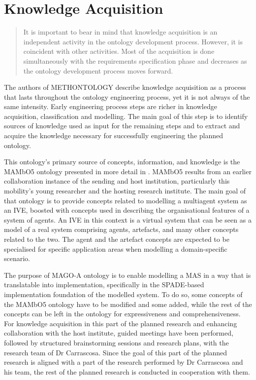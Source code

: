 \chapter{Knowledge Acquisition}\label{ch:Knowledge Acquisition}


\blockquote[{{\cite[p. 37]{fernandez-lopez1997METHONTOLOGYOntologicalArt}}}]{It is important to bear in mind that knowledge acquisition is an independent activity in the ontology development process. However, it is coincident with other activities. \textelp{} Most of the acquisition is done simultaneously with the requirements specification phase and decreases as the ontology development process moves forward.}

The authors of METHONTOLOGY describe knowledge acquisition as a process that lasts throughout the ontology engineering process, yet it is not always of the same intensity. Early engineering process steps are richer in knowledge acquisition, classification and modelling. The main goal of this step is to identify sources of knowledge used as input for the remaining steps and to extract and acquire the knowledge necessary for successfully engineering the planned ontology.

This ontology's primary source of concepts, information, and knowledge is the MAMbO5 ontology presented in more detail in \cite{okresaduric2019MAMbO5NewOntology}. MAMbO5 results from an earlier collaboration instance of the sending and host institution, particularly this mobility's young researcher and the hosting research institute. The main goal of that ontology is to provide concepts related to modelling a multiagent system as an \ac{IVE}, boosted with concepts used in describing the organisational features of a system of agents. An \ac{IVE} in this context is a virtual system that can be seen as a model of a real system comprising agents, artefacts, and many other concepts related to the two. The agent and the artefact concepts are expected to be specialised for specific application areas when modelling a domain-specific scenario.

The purpose of MAGO-A ontology is to enable modelling a \ac{MAS} in a way that is translatable into implementation, specifically in the SPADE-based implementation foundation of the modelled system. To do so, some concepts of the MAMbO5 ontology have to be modified and some added, while the rest of the concepts can be left in the ontology for expressiveness and comprehensiveness. For knowledge acquisition in this part of the planned research and enhancing collaboration with the host institute, guided meetings have been performed, followed by structured brainstorming sessions and research plans, with the research team of Dr Carrascosa. Since the goal of this part of the planned research is aligned with a part of the research performed by Dr Carrascosa and his team, the rest of the planned research is conducted in cooperation with them.

